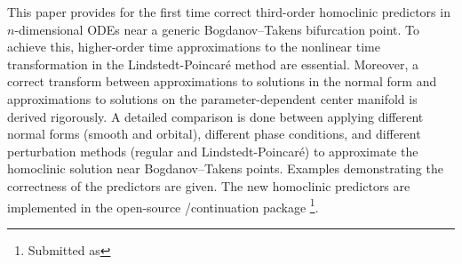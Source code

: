 This paper provides for the first time correct third-order homoclinic
predictors in $n$-dimensional ODEs near a generic Bogdanov--Takens bifurcation
point.  To achieve this, higher-order time approximations to the nonlinear time
transformation in the Lindstedt-Poincar\'e method are essential. Moreover, a
correct transform between approximations to solutions in the normal form and
approximations to solutions on the parameter-dependent center manifold is
derived rigorously.  A detailed comparison is done between applying different
normal forms (smooth and orbital), different phase conditions, and different
perturbation methods (regular and Lindstedt-Poincar\'e) to approximate the
homoclinic solution near Bogdanov--Takens points.  Examples demonstrating the
correctness of the predictors are given. The new homoclinic predictors are
implemented in the open-source \MATLAB/\OCTAVE continuation package \MATCONT\ifthesis\footnote{Submitted as}\fi.
